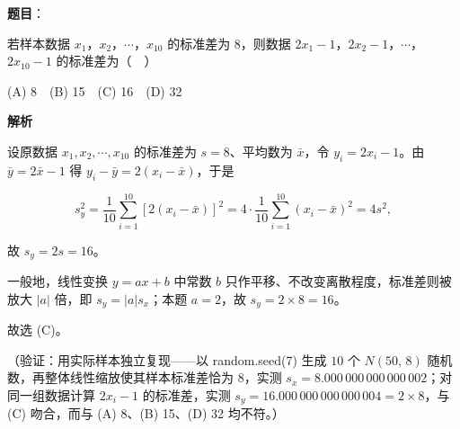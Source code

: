 \begin{answer}

\textbf{题目}：

若样本数据 \(x_1\)，\(x_2\)，\(\cdots\)，\(x_{10}\) 的标准差为 8，则数据 \(2x_1-1\)，\(2x_2-1\)，\(\cdots\)，\(2x_{10}-1\) 的标准差为（　）

(A) 8　(B) 15　(C) 16　(D) 32

\textbf{解析}

设原数据 \(x_{1},x_{2},\cdots,x_{10}\) 的标准差为 \(s=8\)、平均数为 \(\bar{x}\)，令 \(y_{i}=2x_{i}-1\)。由 \(\bar{y}=2\bar{x}-1\) 得 \(y_{i}-\bar{y}=2(x_{i}-\bar{x})\)，于是

\nopagebreak[4]
\[
s_{y}^{2}=\dfrac{1}{10}\sum_{i=1}^{10}\left[2(x_{i}-\bar{x})\right]^{2}=4\cdot\dfrac{1}{10}\sum_{i=1}^{10}(x_{i}-\bar{x})^{2}=4s^{2},
\]

故 \(s_{y}=2s=16\)。

一般地，线性变换 \(y=ax+b\) 中常数 \(b\) 只作平移、不改变离散程度，标准差则被放大 \(|a|\) 倍，即 \(s_{y}=|a|s_{x}\)；本题 \(a=2\)，故 \(s_{y}=2\times 8=16\)。

故选 (C)。

（验证：用实际样本独立复现——以 random.seed(7) 生成 \(10\) 个 \(N(50,\,8)\) 随机数，再整体线性缩放使其样本标准差恰为 \(8\)，实测 \(s_{x}=8.000\,000\,000\,000\,002\)；对同一组数据计算 \(2x_{i}-1\) 的标准差，实测 \(s_{y}=16.000\,000\,000\,000\,004=2\times 8\)，与 (C) 吻合，而与 (A) 8、(B) 15、(D) 32 均不符。）


\end{answer}
